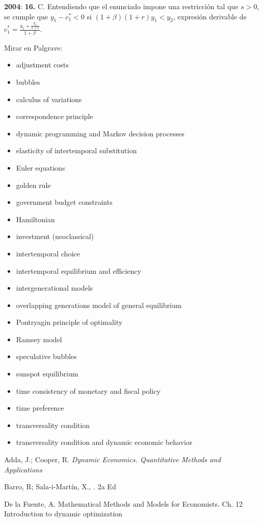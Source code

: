 \documentclass{nuevotema}
\begin{document}
\textbf{2004}: \textbf{16.} C. Entendiendo que el enunciado impone una restricción tal que $s > 0$, se cumple que $y_1 - c_1^* < 0$ si $(1+\beta)(1+r) y_1 < y_2$, expresión derivable de $c_1^* = \frac{y_1 + \frac{y_2}{1+r}}{1+\beta}$.

\bibliografia

Mirar en Palgrave:
\begin{itemize}
    \item adjustment costs
    \item bubbles
    \item calculus of variations
    \item correspondence principle
    \item dynamic programming and Markov decision processes
    \item elasticity of intertemporal substitution
    \item Euler equations
    \item golden rule
    \item government budget constraints
    \item Hamiltonian
    \item investment (neoclassical)
    \item intertemporal choice
    \item intertemporal equilibrium and efficiency
    \item intergenerational models
    \item overlapping generations model of general equilibrium
    \item Pontryagin principle of optimality
    \item Ramsey model
    \item speculative bubbles
    \item sunspot equilibrium
    \item time consistency of monetary and fiscal policy
    \item time preference
    \item transversality condition
    \item transversality condition and dynamic economic behavior
\end{itemize}

Adda, J.; Cooper, R. \textit{Dynamic Economics. Quantitative Methods and Applications}

Barro, R; Sala-i-Martín, X., . 2a Ed

De la Fuente, A. Mathematical Methods and Models for Economists. Ch. 12 Introduction to dynamic optimization
\end{document}
